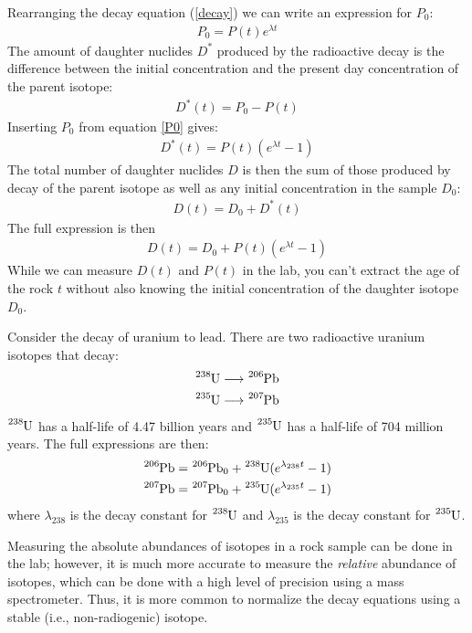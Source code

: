 \documentclass[11pt, oneside]{article}   	%
\begin{document}
Rearranging the decay equation (\ref{decay}) we can write an expression for $P_0$:
\begin{eqnarray}
 P_0 = P(t)e^{\lambda t}
 \label{P0}
\end{eqnarray}
The amount of daughter nuclides  $D^*$ produced by the radioactive decay  is the difference between the initial concentration and the present day concentration of the parent isotope:
\begin{eqnarray}
D^*(t) = P_0 - P(t)
\end{eqnarray}
%
Inserting $P_0$ from equation  \ref{P0} gives: 
\begin{eqnarray}
D^*(t) =  P(t)(e^{\lambda t}-1)
\end{eqnarray}
%
The total number of daughter nuclides $D$ is then the sum of those produced by decay of the parent isotope as well as any initial concentration in the sample $D_0$:
\begin{eqnarray}
D(t) = D_0+D^*(t)
\end{eqnarray}
%
The full expression is then
\begin{eqnarray}
D(t) = D_0+P(t)(e^{\lambda t}-1)
\end{eqnarray}
%
While we can measure $D(t)$ and $P(t)$ in the lab, you can't extract the age of the rock $t$ without also  knowing the initial concentration of the daughter isotope $D_0$. 

Consider the decay of uranium to lead.  There are two radioactive uranium isotopes that decay:
\begin{eqnarray}
 \ce{^{238}U} \longrightarrow \ce{^{206}Pb}  \\
\ce{^{235}U} \longrightarrow \ce{^{207}Pb} 
\end{eqnarray}
 $\ce{^{238}U}$ has a half-life of 4.47 billion years and $\ce{^{235}U}$ has a half-life of 704 million years. The full expressions are then:
\begin{eqnarray}
\ce{^{206}Pb} = \ce{^{206}Pb}_0 + \ce{^{238}U}(e^{\lambda_{238} t}-1) \label{u238}\\
\ce{^{207}Pb} = \ce{^{207}Pb}_0 + \ce{^{235}U}(e^{\lambda_{235} t}-1) \label{u235}
\end{eqnarray}
where $\lambda_{238}$ is the decay constant for $\ce{^{238}U}$ and $\lambda_{235}$ is the decay constant for $\ce{^{235}U}$.

Measuring the absolute abundances of isotopes in a  rock sample can be done in the lab; however, it is much more accurate to measure the {\it relative} abundance of isotopes, which can be done with a high level of precision using a mass spectrometer. Thus, it is more common to normalize the decay equations using a stable (i.e., non-radiogenic) isotope.
\end{document}
